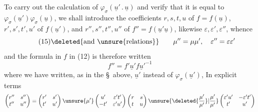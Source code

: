 To carry out the calculation of $\varphi_{\sigma}(\underline{u}'\mathbin{.}\underline{u})$ and verify that it is equal to $\varphi_{\sigma}(\underline{u}')\varphi_{\sigma}(\underline{u})$, we  shall introduce the coefficients $r,s,t,u$ of $f=f(\underline{u})$, $r',s',t',u'$ of  $f(\underline{u}')$, and $r'',s'',t'',u''$ of $f''=f(\underline{u}'\underline{u})$, likewise  $\varepsilon,\varepsilon',\varepsilon''$, whence
\[
\tag{15}
\deleted{\text{and }\unsure{\text{relations}}}\qquad
\mu''=\mu\mu',\quad \varepsilon''=\varepsilon\varepsilon'
\]
and the formula in $f$ in (12) is therefore written
\[
\tag{16}
f''=f'\underline{u}'f\underline{u}'^{-1}
\]
where we have written, as in the \S\ above, $\underline{u}'$ instead of $\varphi_{\sigma}(\underline{u}')$,  In explicit terms
\[
\begin{pmatrix}r''&s''\\t''&u''\end{pmatrix}
=\begin{pmatrix}r'&s'\\t'&u'\end{pmatrix}
\unsure{\mu'}\begin{pmatrix}u'&\varepsilon't'\\-t'&\varepsilon'u'\end{pmatrix}
\begin{pmatrix}r&s\\t&u\end{pmatrix}
\unsure{\deleted{\frac{\mu'}{\mu'}}|\frac{\mu'}{\mu'}}
\begin{pmatrix}\varepsilon'u'&-\varepsilon't'\\t'&u'\end{pmatrix}
\]
